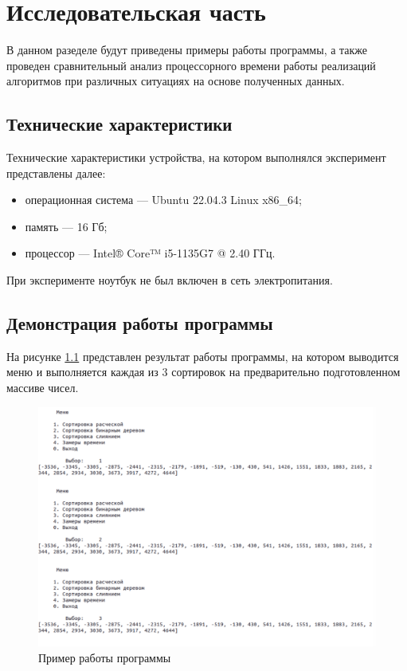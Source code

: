 \chapter{Исследовательская часть}

В данном разеделе будут приведены примеры работы программы, а также проведен сравнительный анализ процессорного времени работы реализаций алгоритмов при различных ситуациях на основе полученных данных.

\section{Технические характеристики}

Технические характеристики устройства, на котором выполнялся эксперимент представлены далее:

\begin{itemize}
	\item операционная система --- Ubuntu 22.04.3 \cite{ubuntu} Linux x86\_64;
	\item память --- 16 Гб;
	\item процессор --- Intel® Core™ i5-1135G7 @ 2.40 ГГц.
\end{itemize}

При эксперименте ноутбук не был включен в сеть электропитания.

\section{Демонстрация работы программы}

На рисунке \ref{fig:example} представлен результат работы программы, на котором выводится меню и выполняется каждая из 3 сортировок на предварительно подготовленном массиве чисел.

\begin{figure}[h!]
	\centering
	\includegraphics[width=\linewidth]{img/example}
	\caption{Пример работы программы}
	\label{fig:example}
\end{figure}
\clearpage

